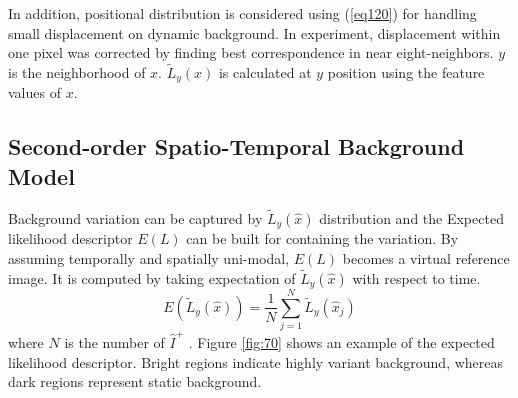 \documentclass[conference]{IEEEtran}
\begin{document}
In addition, positional distribution is considered using (\ref{eq120}) for handling small displacement on dynamic background. In experiment, displacement within one pixel was corrected by finding best correspondence in near eight-neighbors. \begin{math} y \end{math} is the neighborhood of \begin{math} x \end{math}. \begin{math} \tilde{L}_y(x) \end{math}  is calculated at \begin{math} y \end{math} position using the feature values of \begin{math} x \end{math}.


\subsection{Second-order Spatio-Temporal Background Model}
Background variation can be captured by \begin{math} \tilde{L}_y(\hat{x}) \end{math}  distribution and the Expected likelihood descriptor \begin{math} E(L) \end{math} can be built for containing the variation. By assuming temporally and spatially uni-modal, \begin{math} E(L) \end{math} becomes a virtual reference image. It is computed by taking expectation of \begin{math} \tilde{L}_y(\hat{x}) \end{math} with respect to time. 
\begin{equation}\label{eq:130}
  E(\tilde{L}_y(\hat{x})) = \frac{1}{N} \sum_{j=1}^N \tilde{L}_y(\hat{x}_j)
\end{equation}
where \begin{math} N \end{math} is the number of \begin{math} \hat{I}^+ \end{math} . Figure \ref{fig:70} shows an example of the expected likelihood descriptor. Bright regions indicate highly variant background, whereas dark regions represent static background.
\end{document}
